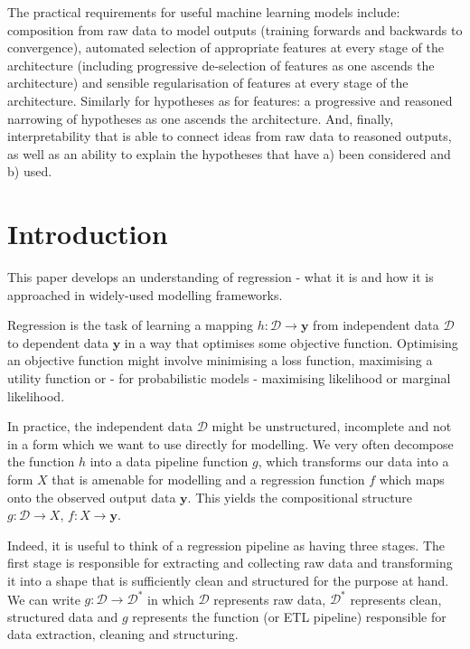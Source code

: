 \documentclass[11pt]{article}
\begin{document}
	
	The practical requirements for useful machine learning models include: composition from raw data to model outputs (training forwards and backwards to convergence), automated selection of appropriate features at every stage of the architecture (including progressive de-selection of features as one ascends the architecture) and sensible regularisation of features at every stage of the architecture. Similarly for hypotheses as for features: a progressive and reasoned narrowing of hypotheses as one ascends the architecture. And, finally, interpretability that is able to connect ideas from raw data to reasoned outputs, as well as an ability to explain the hypotheses that have a) been considered and b) used.
	
	
	
	
	\section{Introduction}
	
	This paper develops an understanding of regression - what it is and how it is approached in widely-used modelling frameworks.
	
	Regression is the task of learning a mapping $h: \mathcal{D} \rightarrow \boldsymbol{y}$ from independent data $\mathcal{D}$ to dependent data $\boldsymbol{y}$ in a way that optimises some objective function. Optimising an objective function might involve minimising a loss function, maximising a utility function or - for probabilistic models - maximising likelihood or marginal likelihood.
	
	In practice, the independent data $\mathcal{D}$ might be unstructured, incomplete and not in a form which we want to use directly for modelling. We very often decompose the function $h$ into a data pipeline function $g$, which transforms our data into a form $X$ that is amenable for modelling and a regression function $f$ which maps onto the observed output data $\boldsymbol{y}$. This yields the compositional structure $g: \mathcal{D} \rightarrow X$, $f: X \rightarrow \boldsymbol{y}$.
	
	Indeed, it is useful to think of a regression pipeline as having three stages. The first stage is responsible for extracting and collecting raw data and transforming it into a shape that is sufficiently clean and structured for the purpose at hand. We can write $g: \mathcal{D} \rightarrow \mathcal{D}^{*}$ in which $\mathcal{D}$ represents raw data, $\mathcal{D}^{*}$ represents clean, structured data and $g$ represents the function (or ETL pipeline) responsible for data extraction, cleaning and structuring.
	
\end{document}
